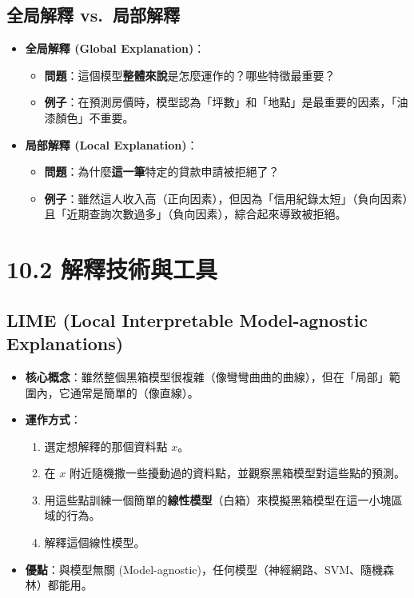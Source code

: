 \documentclass[
  letterpaper,
  DIV=11,
  numbers=noendperiod]{scrreprt}
\providecommand{\tightlist}{%
  \setlength{\itemsep}{0pt}\setlength{\parskip}{0pt}}
\begin{document}
\section{全局解釋 vs.~局部解釋}\label{sec-global-local}

\begin{itemize}
\tightlist
\item
  \textbf{全局解釋 (Global Explanation)}：

  \begin{itemize}
  \tightlist
  \item
    \textbf{問題}：這個模型\textbf{整體來說}是怎麼運作的？哪些特徵最重要？
  \item
    \textbf{例子}：在預測房價時，模型認為「坪數」和「地點」是最重要的因素，「油漆顏色」不重要。
  \end{itemize}
\item
  \textbf{局部解釋 (Local Explanation)}：

  \begin{itemize}
  \tightlist
  \item
    \textbf{問題}：為什麼\textbf{這一筆}特定的貸款申請被拒絕了？
  \item
    \textbf{例子}：雖然這人收入高（正向因素），但因為「信用紀錄太短」（負向因素）且「近期查詢次數過多」（負向因素），綜合起來導致被拒絕。
  \end{itemize}
\end{itemize}

\chapter{10.2 解釋技術與工具}\label{sec-xai-techniques}

\section{LIME (Local Interpretable Model-agnostic
Explanations)}\label{sec-lime}

\begin{itemize}
\tightlist
\item
  \textbf{核心概念}：雖然整個黑箱模型很複雜（像彎彎曲曲的曲線），但在「局部」範圍內，它通常是簡單的（像直線）。
\item
  \textbf{運作方式}：

  \begin{enumerate}
  \def\labelenumi{\arabic{enumi}.}
  \tightlist
  \item
    選定想解釋的那個資料點 \(x\)。
  \item
    在 \(x\)
    附近隨機撒一些擾動過的資料點，並觀察黑箱模型對這些點的預測。
  \item
    用這些點訓練一個簡單的\textbf{線性模型}（白箱）來模擬黑箱模型在這一小塊區域的行為。
  \item
    解釋這個線性模型。
  \end{enumerate}
\item
  \textbf{優點}：與模型無關
  (Model-agnostic)，任何模型（神經網路、SVM、隨機森林）都能用。
\end{itemize}
\end{document}
